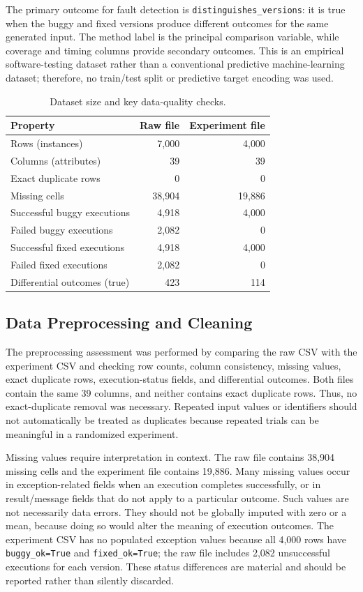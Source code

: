 \documentclass[12pt,onecolumn]{IEEEtran}
\begin{document}
The primary outcome for fault detection is \texttt{distinguishes\_versions}: it is true when the buggy and fixed versions produce different outcomes for the same generated input. The method label is the principal comparison variable, while coverage and timing columns provide secondary outcomes. This is an empirical software-testing dataset rather than a conventional predictive machine-learning dataset; therefore, no train/test split or predictive target encoding was used.

\begin{table}[htbp]
\centering
\caption{Dataset size and key data-quality checks.}
\label{tab:dataset-quality}
\small
\begin{tabular}{@{}lrr@{}}
\toprule
\textbf{Property} & \textbf{Raw file} & \textbf{Experiment file}\\
\midrule
Rows (instances) & 7{,}000 & 4{,}000\\
Columns (attributes) & 39 & 39\\
Exact duplicate rows & 0 & 0\\
Missing cells & 38{,}904 & 19{,}886\\
Successful buggy executions & 4{,}918 & 4{,}000\\
Failed buggy executions & 2{,}082 & 0\\
Successful fixed executions & 4{,}918 & 4{,}000\\
Failed fixed executions & 2{,}082 & 0\\
Differential outcomes (true) & 423 & 114\\
\bottomrule
\end{tabular}
\end{table}

\subsection{Data Preprocessing and Cleaning}

The preprocessing assessment was performed by comparing the raw CSV with the experiment CSV and checking row counts, column consistency, missing values, exact duplicate rows, execution-status fields, and differential outcomes. Both files contain the same 39 columns, and neither contains exact duplicate rows. Thus, no exact-duplicate removal was necessary. Repeated input values or identifiers should not automatically be treated as duplicates because repeated trials can be meaningful in a randomized experiment.

Missing values require interpretation in context. The raw file contains 38,904 missing cells and the experiment file contains 19,886. Many missing values occur in exception-related fields when an execution completes successfully, or in result/message fields that do not apply to a particular outcome. Such values are not necessarily data errors. They should not be globally imputed with zero or a mean, because doing so would alter the meaning of execution outcomes. The experiment CSV has no populated exception values because all 4,000 rows have \texttt{buggy\_ok=True} and \texttt{fixed\_ok=True}; the raw file includes 2,082 unsuccessful executions for each version. These status differences are material and should be reported rather than silently discarded.
\end{document}

